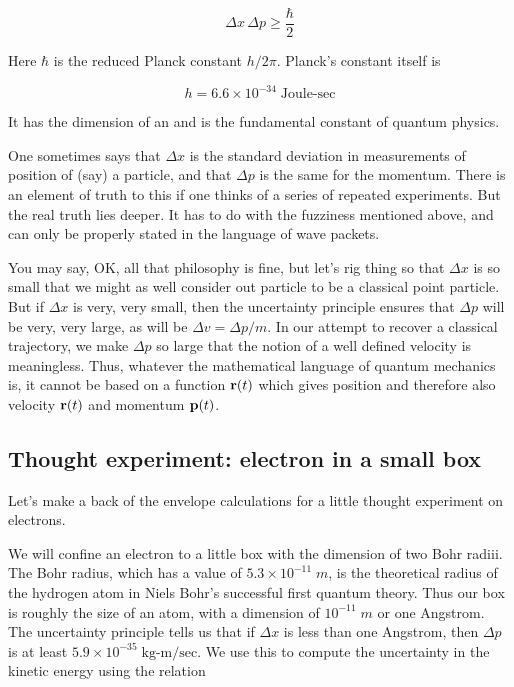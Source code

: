 \begin{equation}
  \Delta x \, \Delta p \ge \frac{\hbar}{2}
\end{equation}

Here $\hbar$ is the reduced Planck constant $h/2\pi$.
Planck's constant itself is

\begin{equation}
h = 6.6\times 10^{-34}\;\text{Joule-sec}
\end{equation}

It has the dimension of an  and is the fundamental constant of quantum physics.

One sometimes says that $\Delta x$ is the standard deviation in measurements of position of (say) a particle, and that $\Delta p$ is the same for the momentum.  There is an element of truth to this if one thinks of a series of repeated experiments.  But the real truth lies deeper.  It has to do with the fuzziness mentioned above, and can only be properly stated in the language of wave packets.  

You may say, OK, all that philosophy is fine, but let's rig thing so that $\Delta x$ is so small that we might as well consider out particle to be a classical point particle.  But if $\Delta x$ is very, very small, then the uncertainty principle ensures that $\Delta p$ will be very, very large, as will be $\Delta v = \Delta p/m$.  In our attempt to recover a classical trajectory, we make $\Delta p$ so large that the notion of a well defined velocity is meaningless. Thus, whatever the mathematical language of quantum mechanics is, it cannot be based on a function ${\bf r}(t)$ which gives position and therefore also velocity ${\bf r}(t)$ and momentum ${\bf p}(t)$.



\subsection{Thought experiment: electron in a small box}


Let's make a back of the envelope calculations for a little thought experiment on electrons.

We will confine an electron to a little box with the dimension of two Bohr radiii.  The Bohr radius, which has a value of $5.3\times 10^{-11}\; m$, is the theoretical radius of the hydrogen atom in Niels Bohr's successful first quantum theory.  Thus our box is roughly the size of an atom, with a dimension of $10^{-11}\; m$ or one Angstrom.  The uncertainty principle tells us that if $\Delta x$ is less than one Angstrom, then $\Delta p$ is at least $5.9\times 10^{-35}\; \text{kg-m/sec}$. We use this to compute the uncertainty in the kinetic energy using the relation

